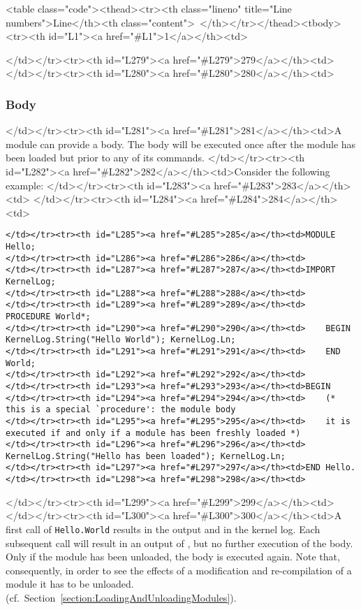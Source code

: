 <table class="code"><thead><tr><th class="lineno" title="Line numbers">Line</th><th class="content"> </th></tr></thead><tbody><tr><th id="L1"><a href="#L1">1</a></th><td>\documentclass[a4paper,11pt]{article}
\begin{document}
</td></tr><tr><th id="L279"><a href="#L279">279</a></th><td>
</td></tr><tr><th id="L280"><a href="#L280">280</a></th><td>\subsubsection{Body}
</td></tr><tr><th id="L281"><a href="#L281">281</a></th><td>A module can provide a body. The body will be executed once after the module has been loaded but prior to any of its commands.
</td></tr><tr><th id="L282"><a href="#L282">282</a></th><td>Consider the following example:
</td></tr><tr><th id="L283"><a href="#L283">283</a></th><td>
</td></tr><tr><th id="L284"><a href="#L284">284</a></th><td>\begin{lstlisting}[language=Oberon,frame=none,caption=A simple Oberon Module]
</td></tr><tr><th id="L285"><a href="#L285">285</a></th><td>MODULE Hello;
</td></tr><tr><th id="L286"><a href="#L286">286</a></th><td>
</td></tr><tr><th id="L287"><a href="#L287">287</a></th><td>IMPORT KernelLog;
</td></tr><tr><th id="L288"><a href="#L288">288</a></th><td>
</td></tr><tr><th id="L289"><a href="#L289">289</a></th><td>    PROCEDURE World*;
</td></tr><tr><th id="L290"><a href="#L290">290</a></th><td>    BEGIN KernelLog.String("Hello World"); KernelLog.Ln;
</td></tr><tr><th id="L291"><a href="#L291">291</a></th><td>    END World;
</td></tr><tr><th id="L292"><a href="#L292">292</a></th><td>
</td></tr><tr><th id="L293"><a href="#L293">293</a></th><td>BEGIN
</td></tr><tr><th id="L294"><a href="#L294">294</a></th><td>    (* this is a special `procedure': the module body
</td></tr><tr><th id="L295"><a href="#L295">295</a></th><td>    it is executed if and only if a module has been freshly loaded *)
</td></tr><tr><th id="L296"><a href="#L296">296</a></th><td>    KernelLog.String("Hello has been loaded"); KernelLog.Ln;
</td></tr><tr><th id="L297"><a href="#L297">297</a></th><td>END Hello.
</td></tr><tr><th id="L298"><a href="#L298">298</a></th><td>\end{lstlisting}
</td></tr><tr><th id="L299"><a href="#L299">299</a></th><td>
</td></tr><tr><th id="L300"><a href="#L300">300</a></th><td>A first call of \verb+Hello.World+ results in the output  and  in the kernel log. Each subsequent call will result in an output of , but no further execution of the body. Only if the module has been unloaded, the body is executed again. Note that, consequently, in order to see the effects of a modification and re-compilation of a module it has to be unloaded. (cf.~Section~\ref{section:LoadingAndUnloadingModules}).
\end{document}
